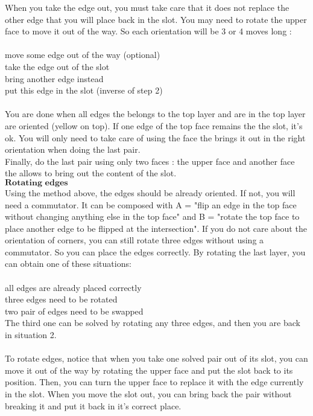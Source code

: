 \documentclass{article}
\begin{document}
When you take the edge out, you must take care that it does not replace the other edge that you will place back in the slot. You may need to rotate the upper face to move it out of the way.
So each orientation will be 3 or 4 moves long :
\\\\move some edge out of the way (optional)
\\take the edge out of the slot
\\bring another edge instead
\\put this edge in the slot (inverse of step 2)
\\\\You are done when all edges the belongs to the top layer and are in the top layer are oriented (yellow on top). If one edge of the top face remains the the slot, it's ok. You will only need to take care of using the face the brings it out in the right orientation when doing the last pair.
\\Finally, do the last pair using only two faces : the upper face and another face the allows to bring out the content of the slot.
\\$\textbf{Rotating edges}$\\Using the method above, the edges should be already oriented. If not, you will need a commutator. It can be composed with A = "flip an edge in the top face without changing anything else in the top face" and B = "rotate the top face to place another edge to be flipped at the intersection".
If you do not care about the orientation of corners, you can still rotate three edges without using a commutator. So you can place the edges correctly.
By rotating the last layer, you can obtain one of these situations:
\\\\all edges are already placed correctly
\\three edges need to be rotated
\\two pair of edges need to be swapped
\\The third one can be solved by rotating any three edges, and then you are back in situation 2.
\\\\To rotate edges, notice that when you take one solved pair out of its slot, you can move it out of the way by rotating the upper face and put the slot back to its position. Then, you can turn the upper face to replace it with the edge currently in the slot. When you move the slot out, you can bring back the pair without breaking it and put it back in it's correct place.
\end{document}
